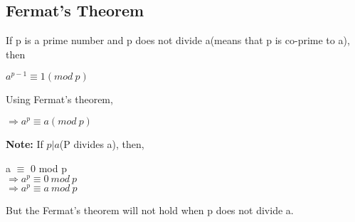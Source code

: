 \documentclass[11pt]{article}
\begin{document}
\begin{itemize}
    \subsection{Fermat's Theorem}
    If p is a prime number and p does not divide a(means that p is co-prime to a), then
    \begin{center}
        $a^{p-1} \equiv 1 (mod\ p)$
    \end{center}
    Using Fermat's theorem,
    \begin{center}
        $\Rightarrow a^p \equiv a (mod \ p)$
    \end{center}
    \textbf{Note:} If $p|a$(P divides a), then,
    \begin{center}
        a $\equiv$ 0 mod p\\
        $\Rightarrow a^p \equiv 0 \ mod\ p$\\
        $\Rightarrow a^p \equiv a \ mod\ p$\\
    \end{center}
    But the Fermat's theorem will not hold when p does not divide a.
\end{itemize}
\end{document}
